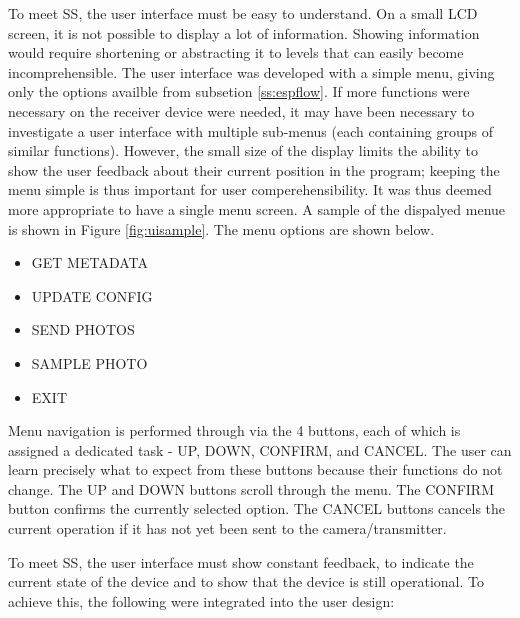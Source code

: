 \documentclass[class=report,11pt,crop=false]{standalone}
\begin{document}
To meet SS, the user interface must be easy to understand. On a small LCD screen, it is not possible to display a lot of information. Showing information would require shortening or abstracting it to levels that can easily become incomprehensible.  The user interface was developed with a simple menu, giving only the options availble from subsetion \ref{ss:espflow}. If more functions were necessary on the receiver device were needed, it may have been necessary to investigate a user interface with multiple sub-menus (each containing groups of similar functions). However, the small size of the display limits the ability to show the user feedback about their current position in the program; keeping the menu simple is thus important for user comperehensibility. It was thus deemed more appropriate to have a single menu screen. A sample of the dispalyed menue is shown in Figure \ref{fig:uisample}. The menu options are shown below. 
\begin{itemize}
    \item GET METADATA
    \item UPDATE CONFIG
    \item SEND PHOTOS
    \item SAMPLE PHOTO
    \item EXIT
\end{itemize}

Menu navigation is performed through via the 4 buttons, each of which is assigned a dedicated task - UP, DOWN, CONFIRM, and CANCEL. The user can learn precisely what to expect from these buttons because their functions do not change. The UP and DOWN buttons scroll through the menu. The CONFIRM button confirms the currently selected option. The CANCEL buttons cancels the current operation if it has not yet been sent to the camera/transmitter.

To meet SS, the user interface must show constant feedback, to indicate the current state of the device and to show that the device is still operational. To achieve this, the following were integrated into the user design:
\end{document}
